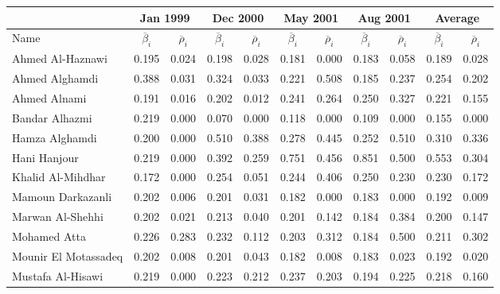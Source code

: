 \begin{subappendices}
\begin{table}
\begin{center}
\begin{tabular}{l cc cccccccc}
\toprule
 & \multicolumn{2}{c}{Jan 1999} & \multicolumn{2}{c}{Dec 2000} & \multicolumn{2}{c}{May 2001} & \multicolumn{2}{c}{Aug 2001} & \multicolumn{2}{c}{Average} \\[1ex]
\midrule
Name  & $\overline{\beta}_{i}$ & $\overline{\rho}_{i}$ & $\overline{\beta}_{i}$ & $\overline{\rho}_{i}$ & $\overline{\beta}_{i}$  & $\overline{\rho}_{i}$ & $\overline{\beta}_{i}$ & $\overline{\rho}_{i}$ & $\overline{\beta}_{i}$ & $\overline{\rho}_{i}$ \\
\midrule
Ahmed Al-Haznawi      	& 0.195	  & 0.024   & 0.198   & 0.028   & 0.181   & 0.000   & 0.183   & 0.058   & 0.189   & 0.028   \\
Ahmed Alghamdi        	& 0.388   & 0.031   & 0.324   & 0.033   & 0.221   & 0.508   & 0.185   & 0.237   & 0.254   & 0.202   \\
Ahmed Alnami          	& 0.191   & 0.016   & 0.202   & 0.012   & 0.241   & 0.264   & 0.250   & 0.327   & 0.221   & 0.155   \\
Bandar Alhazmi        	& 0.219   & 0.000   & 0.070   & 0.000   & 0.118   & 0.000   & 0.109   & 0.000   & 0.155   & 0.000   \\
Hamza Alghamdi        	& 0.200   & 0.000   & 0.510   & 0.388   & 0.278   & 0.445   & 0.252   & 0.510   & 0.310   & 0.336   \\
Hani Hanjour          	& 0.219   & 0.000   & 0.392   & 0.259   & 0.751   & 0.456   & 0.851   & 0.500   & 0.553   & 0.304   \\
Khalid Al-Mihdhar     	& 0.172   & 0.000   & 0.254   & 0.051   & 0.244   & 0.406   & 0.250   & 0.230   & 0.230   & 0.172   \\
Mamoun Darkazanli     	& 0.202   & 0.006   & 0.201   & 0.031   & 0.182   & 0.000   & 0.183   & 0.000   & 0.192   & 0.009   \\
Marwan Al-Shehhi      	& 0.202   & 0.021   & 0.213   & 0.040   & 0.201   & 0.142   & 0.184   & 0.384   & 0.200   & 0.147   \\
Mohamed Atta          	& 0.226   & 0.283   & 0.232   & 0.112   & 0.203   & 0.312   & 0.184   & 0.500   & 0.211   & 0.302   \\
Mounir El Motassadeq  	& 0.202   & 0.008   & 0.201   & 0.043   & 0.182   & 0.008   & 0.183   & 0.023   & 0.192   & 0.020   \\
Mustafa Al-Hisawi     	& 0.219   & 0.000   & 0.223   & 0.212   & 0.237   & 0.203   & 0.194   & 0.225   & 0.218   & 0.160   \\

\end{tabular}
\end{center}
\end{table}
\end{subappendices}
